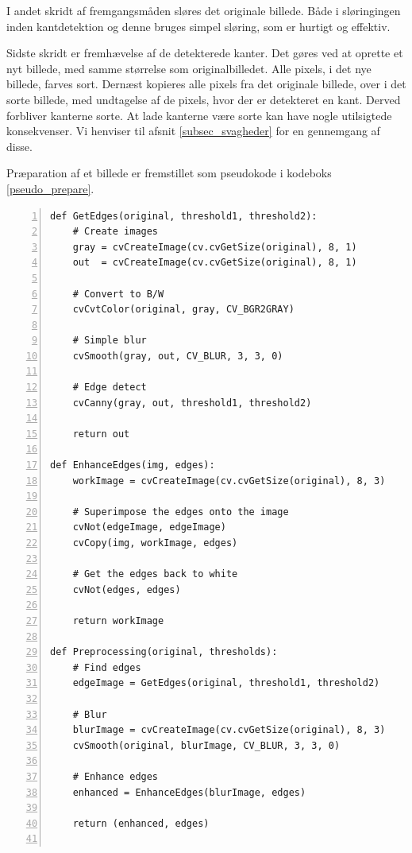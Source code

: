 {I andet skridt af fremgangsmåden sløres det originale billede. Både i
sløringingen inden kantdetektion og denne bruges simpel sløring, som er
hurtigt og effektiv.

Sidste skridt er fremhævelse af de detekterede kanter. Det gøres ved at
oprette et nyt billede, med samme størrelse som originalbilledet. Alle
pixels, i det nye billede, farves sort. Dernæst kopieres alle pixels fra
det originale billede, over i det sorte billede, med undtagelse af de
pixels, hvor der er detekteret en kant. Derved forbliver kanterne sorte.
At lade kanterne være sorte kan have nogle utilsigtede konsekvenser. Vi
henviser til afsnit \ref{subsec_svagheder} for en gennemgang af disse.

Præparation af et billede er fremstillet som pseudokode i kodeboks
\ref{pseudo_prepare}.

\begin{lstlisting}[caption={Pseudokode for metoder til præparation af
    billeder.},captionpos=b,label={pseudo_prepare},numbers=left,
    frame=tb, breaklines=false, float=h]
def GetEdges(original, threshold1, threshold2):
    # Create images
    gray = cvCreateImage(cv.cvGetSize(original), 8, 1)
    out  = cvCreateImage(cv.cvGetSize(original), 8, 1)

    # Convert to B/W
    cvCvtColor(original, gray, CV_BGR2GRAY)

    # Simple blur
    cvSmooth(gray, out, CV_BLUR, 3, 3, 0)

    # Edge detect
    cvCanny(gray, out, threshold1, threshold2)

    return out

def EnhanceEdges(img, edges):
    workImage = cvCreateImage(cv.cvGetSize(original), 8, 3)

    # Superimpose the edges onto the image
    cvNot(edgeImage, edgeImage)
    cvCopy(img, workImage, edges)

    # Get the edges back to white
    cvNot(edges, edges)

    return workImage

def Preprocessing(original, thresholds):
    # Find edges
    edgeImage = GetEdges(original, threshold1, threshold2)

    # Blur
    blurImage = cvCreateImage(cv.cvGetSize(original), 8, 3)
    cvSmooth(original, blurImage, CV_BLUR, 3, 3, 0)

    # Enhance edges
    enhanced = EnhanceEdges(blurImage, edges)

    return (enhanced, edges)


\end{lstlisting}}
